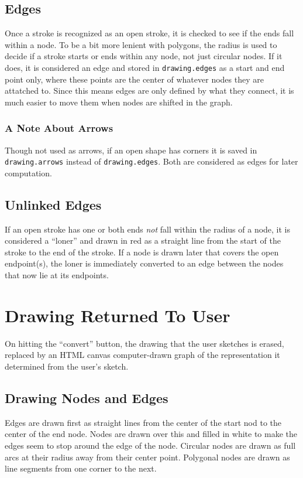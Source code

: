 \documentclass[12pt]{article}
\begin{document}
\subsection{Edges} %
\par Once a stroke is recognized as an open stroke, it is checked to see if the ends fall within a node. To be a bit more lenient with polygons, the radius is used to decide if a stroke starts or ends within any node, not just circular nodes. If it does, it is considered an edge and stored in \texttt{drawing.edges} as a start and end point only, where these points are the center of whatever nodes they are attatched to. Since this means edges are only defined by what they connect, it is much easier to move them when nodes are shifted in the graph.
\subsubsection{A Note About Arrows}
\par Though not used as arrows, if an open shape has corners it is saved in \texttt{drawing.arrows} instead of \texttt{drawing.edges}. Both are considered as edges for later computation.
\subsection{Unlinked Edges} %
\par If an open stroke has one or both ends \textit{not} fall within the radius of a node, it is considered a ``loner'' and drawn in red as a straight line from the start of the stroke to the end of the stroke. If a node is drawn later that covers the open endpoint(s), the loner is immediately converted to an edge between the nodes that now lie at its endpoints.

\section{Drawing Returned To User}
On hitting the ``convert'' button, the drawing that the user sketches is erased, replaced by an HTML canvas computer-drawn graph of the representation it determined from the user's sketch.
\subsection{Drawing Nodes and Edges}
\par Edges are drawn first as straight lines from the center of the start nod to the center of the end node. Nodes are drawn over this and filled in white to make the edges seem to stop around the edge of the node. Circular nodes are drawn as full arcs at their radius away from their center point. Polygonal nodes are drawn as line segments from one corner to the next.
\end{document}
